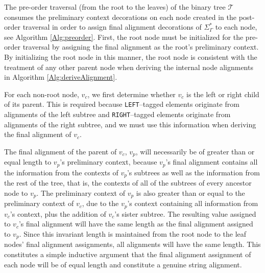 \documentclass{bmcart}
\begin{document}
The pre-order traversal (from the root to the leaves) of the binary tree $\mathcal{T}$ consumes the preliminary context decorations on each node created in the post-order traversal in order to assign final alignment decorations of $\Sigma_{\Gamma}^{*}$ to each node, see Algorithm \ref{Alg:preorder}.
First, the root node must be initialized for the pre-order traversal by assigning the final alignment as the root's preliminary context.
By initializing the root node in this manner, the root node is consistent with the treatment of any other parent node when deriving the internal node alignments in Algorithm \ref{Alg:deriveAlignment}.

For each non-root node, $v_c$, we first determine whether $v_c$ is the left or right child of its parent.
This is required because \texttt{LEFT}--tagged elements originate from alignments of the left subtree and \texttt{RIGHT}--tagged elements originate from alignments of the right subtree, and we must use this information when deriving the final alignment of $v_c$.

The final alignment of the parent of $v_c$, $v_p$, will necessarily be of greater than or equal length to $v_p$'s preliminary context, because $v_p$'s final alignment contains all the information from the contexts of $v_p$'s subtrees as well as the information from the rest of the tree, that is, the contexts of all of the subtrees of every ancestor node to $v_p$.
The preliminary context of $v_p$ is also greater than or equal to the preliminary context of $v_c$, due to the $v_p$'s context containing all information from $v_c$'s context, plus the addition of $v_c$'s sister subtree.
The resulting value assigned to $v_c$'s final alignment will have the same length as the final alignment assigned to $v_p$.
Since this invariant length is maintained from the root node to the leaf nodes' final alignment assignments, all alignments will have the same length.
This constitutes a simple inductive argument that the final alignment assignment of each node will be of equal length and constitute a genuine string alignment.
\end{document}
